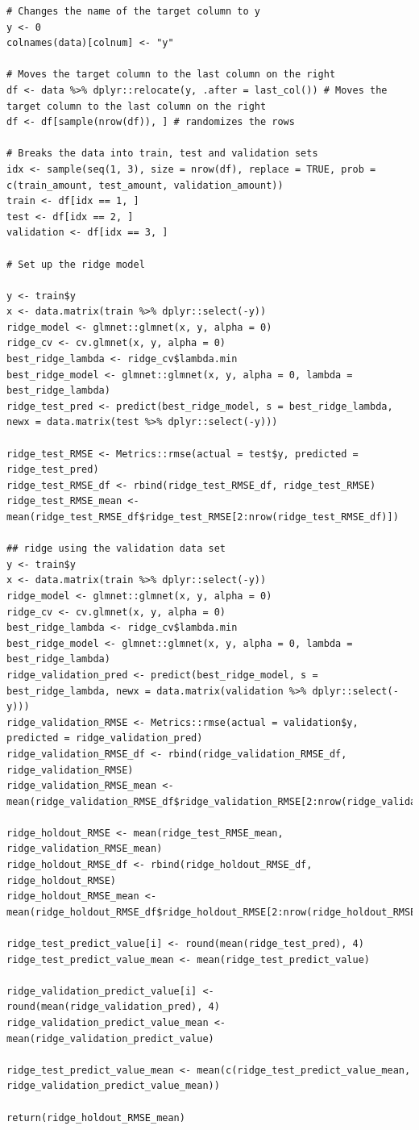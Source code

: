 \documentclass[
]{book}
\begin{document}
\begin{verbatim}
# Changes the name of the target column to y
y <- 0
colnames(data)[colnum] <- "y"

# Moves the target column to the last column on the right
df <- data %>% dplyr::relocate(y, .after = last_col()) # Moves the target column to the last column on the right
df <- df[sample(nrow(df)), ] # randomizes the rows

# Breaks the data into train, test and validation sets
idx <- sample(seq(1, 3), size = nrow(df), replace = TRUE, prob = c(train_amount, test_amount, validation_amount))
train <- df[idx == 1, ]
test <- df[idx == 2, ]
validation <- df[idx == 3, ]

# Set up the ridge model

y <- train$y
x <- data.matrix(train %>% dplyr::select(-y))
ridge_model <- glmnet::glmnet(x, y, alpha = 0)
ridge_cv <- cv.glmnet(x, y, alpha = 0)
best_ridge_lambda <- ridge_cv$lambda.min
best_ridge_model <- glmnet::glmnet(x, y, alpha = 0, lambda = best_ridge_lambda)
ridge_test_pred <- predict(best_ridge_model, s = best_ridge_lambda, newx = data.matrix(test %>% dplyr::select(-y)))

ridge_test_RMSE <- Metrics::rmse(actual = test$y, predicted = ridge_test_pred)
ridge_test_RMSE_df <- rbind(ridge_test_RMSE_df, ridge_test_RMSE)
ridge_test_RMSE_mean <- mean(ridge_test_RMSE_df$ridge_test_RMSE[2:nrow(ridge_test_RMSE_df)])

## ridge using the validation data set
y <- train$y
x <- data.matrix(train %>% dplyr::select(-y))
ridge_model <- glmnet::glmnet(x, y, alpha = 0)
ridge_cv <- cv.glmnet(x, y, alpha = 0)
best_ridge_lambda <- ridge_cv$lambda.min
best_ridge_model <- glmnet::glmnet(x, y, alpha = 0, lambda = best_ridge_lambda)
ridge_validation_pred <- predict(best_ridge_model, s = best_ridge_lambda, newx = data.matrix(validation %>% dplyr::select(-y)))
ridge_validation_RMSE <- Metrics::rmse(actual = validation$y, predicted = ridge_validation_pred)
ridge_validation_RMSE_df <- rbind(ridge_validation_RMSE_df, ridge_validation_RMSE)
ridge_validation_RMSE_mean <- mean(ridge_validation_RMSE_df$ridge_validation_RMSE[2:nrow(ridge_validation_RMSE_df)])

ridge_holdout_RMSE <- mean(ridge_test_RMSE_mean, ridge_validation_RMSE_mean)
ridge_holdout_RMSE_df <- rbind(ridge_holdout_RMSE_df, ridge_holdout_RMSE)
ridge_holdout_RMSE_mean <- mean(ridge_holdout_RMSE_df$ridge_holdout_RMSE[2:nrow(ridge_holdout_RMSE_df)])

ridge_test_predict_value[i] <- round(mean(ridge_test_pred), 4)
ridge_test_predict_value_mean <- mean(ridge_test_predict_value)

ridge_validation_predict_value[i] <- round(mean(ridge_validation_pred), 4)
ridge_validation_predict_value_mean <- mean(ridge_validation_predict_value)

ridge_test_predict_value_mean <- mean(c(ridge_test_predict_value_mean, ridge_validation_predict_value_mean))

return(ridge_holdout_RMSE_mean)
\end{verbatim}
\end{document}
